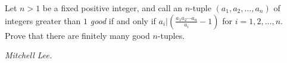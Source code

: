 Let $n>1$ be a fixed positive integer, and call an $n$-tuple $(a_1,a_2,\ldots,a_n)$ of integers greater than $1$ \textit{good} if and only if $a_i\Big|\left(\frac{a_1a_2\cdots a_n}{a_i}-1\right)$ for $i=1,2,\ldots,n$. Prove that there are finitely many good $n$-tuples.

\textit{Mitchell Lee.}